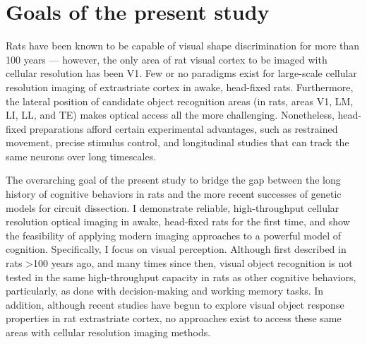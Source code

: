 

\section{Goals of the present study}

Rats have been known to be capable of visual shape discrimination for more than 100 years --- however, the only area of rat visual cortex to be imaged with cellular resolution has been V1\cite{Ohki2005,Greenberg2008}. Few or no paradigms exist for large-scale cellular resolution imaging of extrastriate cortex in awake, head-fixed rats. Furthermore, the lateral position of candidate object recognition areas (in rats, areas V1, LM, LI, LL, and TE) makes optical access all the more challenging. Nonetheless, head-fixed preparations afford certain experimental advantages, such as restrained movement, precise stimulus control, and longitudinal studies that can track the same neurons over long timescales. 

The overarching goal of the present study to bridge the gap between the long history of cognitive behaviors in rats and the more recent successes of genetic models for circuit dissection. I demonstrate reliable, high-throughput cellular resolution optical imaging in awake, head-fixed rats for the first time, and show the feasibility of applying modern imaging approaches to a powerful model of cognition. Specifically, I focus on visual perception. Although first described in rats >100 years ago, and many times since then, visual object recognition is not tested in the same high-throughput capacity in rats as other cognitive behaviors, particularly, as done with decision-making and working memory tasks. In addition, although recent studies have begun to explore visual object response properties in rat extrastriate cortex, no approaches exist to access these same areas with cellular resolution imaging methods. 

